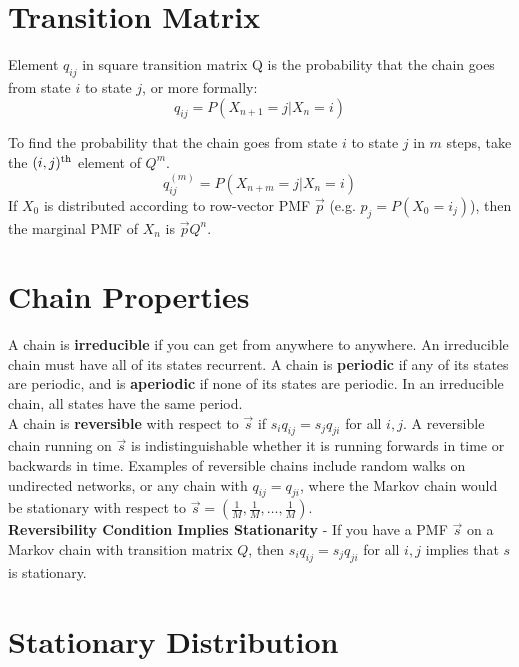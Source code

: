 \documentclass[11.5pt]{article}
\begin{document}
\begin{notes}
\section*{Transition Matrix}
Element $q_{ij}$ in square transition matrix Q is the probability that the chain goes from state $i$ to state $j$, or more formally:
\[q_{ij} = P(X_{n+1} = j | X_n = i)\]

To find the probability that the chain goes from state $i$ to state $j$ in $m$ steps, take the $(i, j)^\textnormal{th}$ element of $Q^m$.
\[q^{(m)}_{ij} = P(X_{n+m} = j | X_n = i)\]
If $X_0$ is distributed according to row-vector PMF $\vec{p}$ (e.g. $p_j = P(X_0 = i_j)$), then the marginal PMF of $X_n$ is $\vec{p}Q^n$.



\section*{Chain Properties}
A chain is \textbf{irreducible} if you can get from anywhere to anywhere. An irreducible chain must have all of its states recurrent. A chain is \textbf{periodic} if any of its states are periodic, and is \textbf{aperiodic} if none of its states are periodic. In an irreducible chain, all states have the same period. \\

A chain is \textbf{reversible} with respect to $\vec{s}$ if $s_iq_{ij} = s_jq_{ji}$ for all $i, j$.  A reversible chain running on $\vec{s}$ is indistinguishable whether it is running forwards in time or backwards in time. Examples of reversible chains include random walks on undirected networks, or any chain with $q_{ij} = q_{ji}$, where the Markov chain would be stationary with respect to $\vec{s} = (\frac{1}{M}, \frac{1}{M}, \dots, \frac{1}{M})$. \\

\textbf{Reversibility Condition Implies Stationarity} - If you have a PMF $\vec{s}$ on a Markov chain with transition matrix $Q$, then $s_iq_{ij} = s_jq_{ji}$ for all $i, j$ implies that $s$ is stationary.


\section*{Stationary Distribution}


\end{notes}
\end{document}
